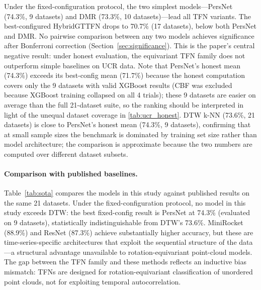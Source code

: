 \documentclass[a4paper,11pt]{article}
\begin{document}
Under the fixed-configuration protocol, the two simplest models---PersNet (74.3\%, 9 datasets) and DMR (73.3\%, 10 datasets)---lead all TFN variants.
The best-configured HybridGTTFN drops to 70.7\% (17 datasets), below both PersNet and DMR.
No pairwise comparison between any two models achieves significance after Bonferroni correction (Section~\ref{sec:significance}).
This is the paper's central negative result: under honest evaluation, the equivariant TFN family does not outperform simple baselines on UCR data.
Note that PersNet's honest mean (74.3\%) exceeds its best-config mean (71.7\%) because the honest computation covers only the 9 datasets with valid XGBoost results (CBF was excluded because XGBoost training collapsed on all 4 trials); these 9 datasets are easier on average than the full 21-dataset suite, so the ranking should be interpreted in light of the unequal dataset coverage in \cref{tab:ucr_honest}.
DTW k-NN (73.6\%, 21 datasets) is close to PersNet's honest mean (74.3\%, 9 datasets), confirming that at small sample sizes the benchmark is dominated by training set size rather than model architecture; the comparison is approximate because the two numbers are computed over different dataset subsets.

\paragraph{Comparison with published baselines.}
Table~\ref{tab:sota} compares the models in this study against published results on the same 21 datasets.
Under the fixed-configuration protocol, no model in this study exceeds DTW: the best fixed-config result is PersNet at 74.3\% (evaluated on 9 datasets), statistically indistinguishable from DTW's 73.6\%.
MiniRocket (88.9\%) and ResNet (87.3\%) achieve substantially higher accuracy, but these are time-series-specific architectures that exploit the sequential structure of the data---a structural advantage unavailable to rotation-equivariant point-cloud models.
The gap between the TFN family and these methods reflects an inductive bias mismatch: TFNs are designed for rotation-equivariant classification of unordered point clouds, not for exploiting temporal autocorrelation.
\end{document}
